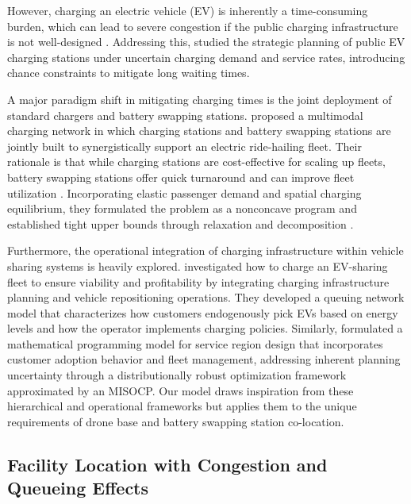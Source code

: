 \documentclass[final,3p,authoryear]{elsarticle}
\begin{document}
However, charging an electric vehicle (EV) is inherently a time-consuming burden, which can lead to severe congestion if the public charging infrastructure is not well-designed \citep{liRobustPlanning2025TransportationResearchPartB:Methodological}.
Addressing this, \citet{liRobustPlanning2025TransportationResearchPartB:Methodological} studied the strategic planning of public EV charging stations under uncertain charging demand and service rates, introducing chance constraints to mitigate long waiting times.

A major paradigm shift in mitigating charging times is the joint deployment of standard chargers and battery swapping stations.
\citet{laiMultimodalCharging2024TransportationResearchPartB:Methodological} proposed a multimodal charging network in which charging stations and battery swapping stations are jointly built to synergistically support an electric ride-hailing fleet.
Their rationale is that while charging stations are cost-effective for scaling up fleets, battery swapping stations offer quick turnaround and can improve fleet utilization \citep{laiMultimodalCharging2024TransportationResearchPartB:Methodological}.
Incorporating elastic passenger demand and spatial charging equilibrium, they formulated the problem as a nonconcave program and established tight upper bounds through relaxation and decomposition \citep{laiMultimodalCharging2024TransportationResearchPartB:Methodological}.

Furthermore, the operational integration of charging infrastructure within vehicle sharing systems is heavily explored.
\citet{heChargingElectric2020M&SOM} investigated how to charge an EV-sharing fleet to ensure viability and profitability by integrating charging infrastructure planning and vehicle repositioning operations.
They developed a queuing network model that characterizes how customers endogenously pick EVs based on energy levels and how the operator implements charging policies.
Similarly, \citet{heServiceRegion2017M&SOM} formulated a mathematical programming model for service region design that incorporates customer adoption behavior and fleet management, addressing inherent planning uncertainty through a distributionally robust optimization framework approximated by an MISOCP.
Our model draws inspiration from these hierarchical and operational frameworks but applies them to the unique requirements of drone base and battery swapping station co-location.

\subsection{Facility Location with Congestion and Queueing Effects}
\end{document}
